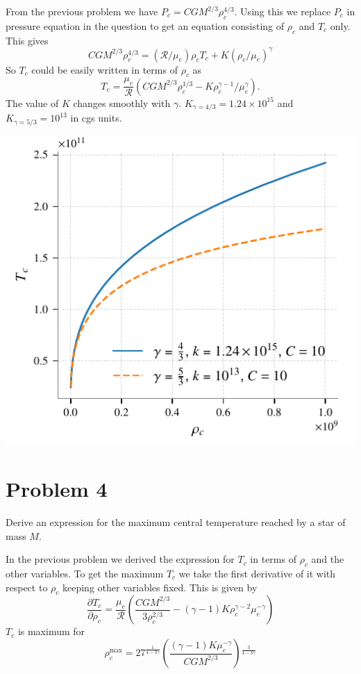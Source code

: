 \documentclass{revtex4-2}
\begin{document}
From the previous problem we have $P_c = CG M^{2/3}\rho_c^{4/3}$. Using this we replace $P_c$ in pressure equation in the question to get an equation consisting of $\rho_c$ and $T_c$ only. This gives
\begin{equation}
  \label{eq:rho-T}
  CG M^{2/3}\rho_c^{4/3} = (\mathcal{R}/\mu_e)\rho_c T_c + K(\rho_c/\mu_e )^\gamma
\end{equation}
So $T_c$ could be easily written in terms of $\rho_c$ as
\begin{equation}
  \label{eq:Tc}
  T_c = \frac{\mu_e}{\mathcal{R}} \left(CGM^{2/3}\rho_c^{1/3} - K \rho_c^{\gamma-1}/\mu_e^\gamma\right).
\end{equation}
The value of $K$ changes smoothly with $\gamma$. $K_{\gamma = 4/3} = 1.24 \times 10^{15}$ and $K_{\gamma = 5/3} = 10^{13}$ in cgs units.
\begin{center}
  \includegraphics{./Tc_vs_rhoc.pdf}
\end{center}

\section*{Problem 4}
\label{sec:problem-4}
Derive an expression for the maximum central temperature reached by a star of mass $M$.

In the previous problem we derived the expression for $T_c$ in terms of $\rho_c$ and the other variables. To get the maximum $T_c$ we take the first derivative of it with respect to $\rho_c$ keeping other variables fixed. This is given by
\begin{equation}
  \label{eq:Tc-1}
  \frac{\partial T_c}{\partial \rho_c} = \frac{\mu _e}{\mathcal{R}} \left(\frac{C G M^{2/3}}{3 \rho _c^{2/3}}-(\gamma -1)
   K \rho _c^{\gamma -2} \mu _e^{-\gamma }\right)
\end{equation}
$T_c$ is maximum for
\begin{equation}
  \label{eq:rhoc-max}
  \rho_c^{\text{max}} = 27^{\frac{1}{4-3 \gamma }} \left(\frac{(\gamma -1) K \mu _e^{-\gamma
   }}{C G M^{2/3}}\right){}^{\frac{3}{4-3 \gamma }}
\end{equation}
\end{document}
